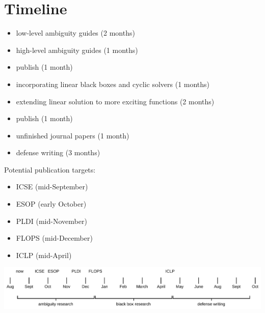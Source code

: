 \section{Timeline}
\label{sec:timeline}
\begin{itemize}
    \item low-level ambiguity guides (2 months)
    \item high-level ambiguity guides (1 months)
    \item publish (1 month)
    \item incorporating linear black boxes and cyclic solvers (1 months)
    \item extending linear solution to more exciting functions (2 months)
    \item publish (1 month)
    \item unfinished journal papers (1 month)
    \item defense writing (3 months)
\end{itemize}
Potential publication targets:
\begin{itemize}
    \item ICSE (mid-September)
    \item ESOP (early October)
    \item PLDI (mid-November)
    \item FLOPS (mid-December)
    \item ICLP (mid-April)
\end{itemize}
\begin{center}
\includegraphics[scale=0.6]{timeline.pdf}
\end{center}
